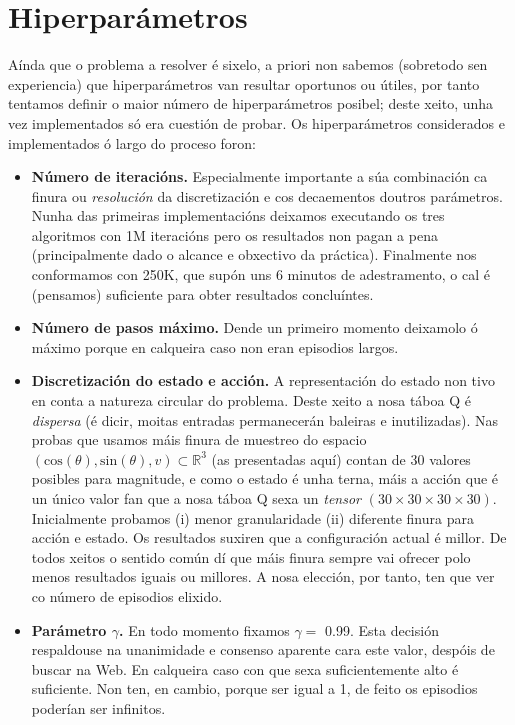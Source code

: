 \documentclass{article}
\begin{document}
\section{Hiperparámetros}
Aínda que o problema a resolver é sixelo, a priori non sabemos (sobretodo sen experiencia) que hiperparámetros van resultar oportunos ou útiles, por tanto tentamos definir o maior número de hiperparámetros posibel; deste xeito, unha vez implementados só era cuestión de probar. Os hiperparámetros considerados e implementados ó largo do proceso foron:
\begin{itemize}
	\item \textbf{Número de iteracións.} Especialmente importante a súa combinación ca finura ou \emph{resolución} da discretización e cos decaementos doutros parámetros. Nunha das primeiras implementacións deixamos executando os tres algoritmos con 1M iteracións pero os resultados non pagan a pena (principalmente dado o alcance e obxectivo da práctica). Finalmente nos conformamos con 250K, que supón uns 6 minutos de adestramento, o cal é (pensamos) suficiente para obter resultados concluíntes. 
	\item \textbf{Número de pasos máximo.} Dende un primeiro momento deixamolo ó máximo porque en calqueira caso non eran episodios largos. 
	\item \textbf{Discretización do estado e acción.} A representación do estado non tivo en conta a natureza circular do problema. Deste xeito a nosa táboa Q é \emph{dispersa} (é dicir, moitas entradas permanecerán baleiras e inutilizadas). Nas probas que usamos máis finura de muestreo do espacio $(\text{cos}(\theta), \text{sin}(\theta),v) \subset \mathbb{R}^3$ (as presentadas aquí) contan de 30 valores posibles para magnitude, e como o estado é unha terna, máis a acción que é un único valor fan que a nosa táboa Q sexa un \emph{tensor} $(30\times 30 \times 30 \times 30)$. Inicialmente probamos (i) menor granularidade (ii) diferente finura para acción e estado. Os resultados suxiren que a configuración actual é millor. De todos xeitos o sentido común dí que máis finura sempre vai ofrecer polo menos resultados iguais ou millores. A nosa elección, por tanto, ten que ver co número de episodios elixido.
	\item \textbf{Parámetro $\gamma$.} En todo momento fixamos $\gamma = $ 0.99. Esta decisión respaldouse na unanimidade e consenso aparente cara este valor, despóis de buscar na Web. En calqueira caso con que sexa suficientemente alto é suficiente. Non ten, en cambio, porque ser igual a 1, de feito os episodios poderían ser infinitos.

\end{itemize}
\end{document}
